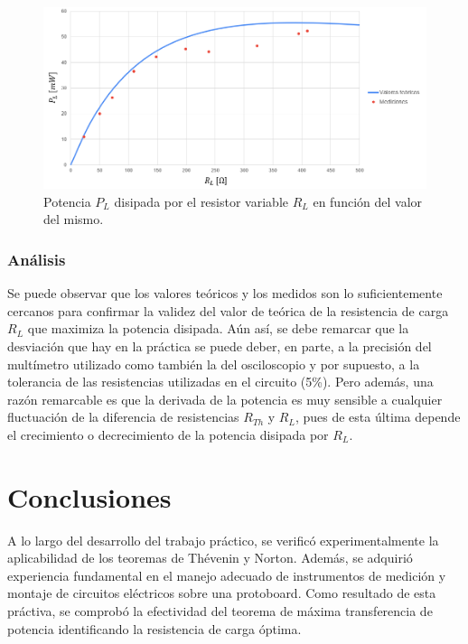 \documentclass{article}
\begin{document}
            \begin{figure}[H]
                \centering
                \includegraphics[width=1\textwidth]{graficoPotencia.png}
                \caption{Potencia $P_L$ disipada por el resistor variable $R_L$ en función del valor del mismo.}
                \label{fig:graficoTransferenciaPotencia}
            \end{figure}

            

            \subsubsection{Análisis}
            \quad Se puede observar que los valores teóricos y los medidos son lo suficientemente cercanos para confirmar 
            la validez del valor de teórica de la resistencia de carga $R_L$ que maximiza la potencia disipada.
            Aún así, se debe remarcar que la desviación que hay en la práctica se puede deber, en parte, a la precisión del multímetro utilizado como también la del osciloscopio
            y por supuesto, a la tolerancia de las resistencias utilizadas en el circuito (5\%). Pero además, una razón remarcable es que la derivada de la potencia es muy sensible a cualquier fluctuación de la diferencia de resistencias $R_{Th}$ y $R_L$, pues de esta última depende el crecimiento o decrecimiento de la potencia disipada por $R_L$.
    \section{Conclusiones}

    \quad A lo largo del desarrollo del trabajo práctico, se verificó experimentalmente
     la aplicabilidad de los teoremas de Thévenin y Norton. Además, se adquirió experiencia 
     fundamental en el manejo adecuado de instrumentos de medición y montaje de circuitos 
     eléctricos sobre una protoboard. Como resultado de esta práctiva, se comprobó la efectividad 
     del teorema de máxima transferencia de potencia identificando la resistencia de carga óptima.
\end{document}
